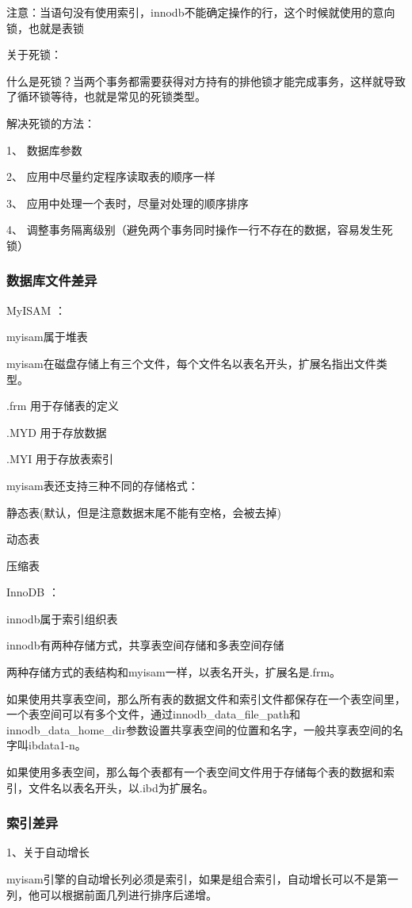 \documentclass[UTF8]{ctexart}
\begin{document}
注意：当语句没有使用索引，innodb不能确定操作的行，这个时候就使用的意向锁，也就是表锁

关于死锁：

什么是死锁？当两个事务都需要获得对方持有的排他锁才能完成事务，这样就导致了循环锁等待，也就是常见的死锁类型。

解决死锁的方法：

1、  数据库参数

2、  应用中尽量约定程序读取表的顺序一样

3、  应用中处理一个表时，尽量对处理的顺序排序

4、  调整事务隔离级别（避免两个事务同时操作一行不存在的数据，容易发生死锁）
\subsubsection{数据库文件差异}
MyISAM ：

myisam属于堆表

myisam在磁盘存储上有三个文件，每个文件名以表名开头，扩展名指出文件类型。

.frm 用于存储表的定义

.MYD 用于存放数据

.MYI 用于存放表索引

myisam表还支持三种不同的存储格式：

静态表(默认，但是注意数据末尾不能有空格，会被去掉)

动态表

压缩表

InnoDB ：

innodb属于索引组织表

innodb有两种存储方式，共享表空间存储和多表空间存储

两种存储方式的表结构和myisam一样，以表名开头，扩展名是.frm。

如果使用共享表空间，那么所有表的数据文件和索引文件都保存在一个表空间里，一个表空间可以有多个文件，通过innodb\_data\_file\_path和innodb\_data\_home\_dir参数设置共享表空间的位置和名字，一般共享表空间的名字叫ibdata1-n。

如果使用多表空间，那么每个表都有一个表空间文件用于存储每个表的数据和索引，文件名以表名开头，以.ibd为扩展名。

\subsubsection{索引差异}
1、关于自动增长

myisam引擎的自动增长列必须是索引，如果是组合索引，自动增长可以不是第一列，他可以根据前面几列进行排序后递增。
\end{document}
